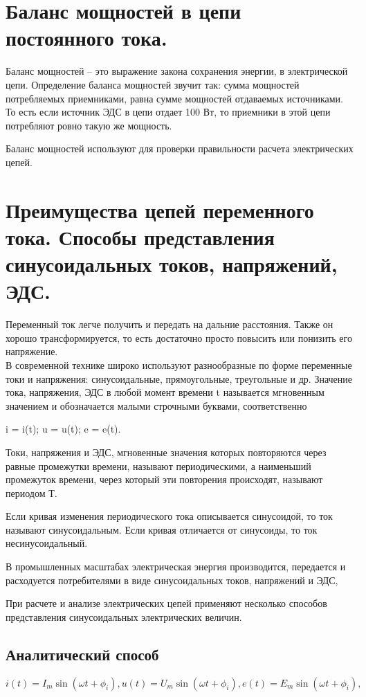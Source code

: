 \documentclass[a4paper, 12pt]{article}
\begin{document}
\section{Баланс мощностей в цепи постоянного тока.}
Баланс мощностей – это выражение закона сохранения энергии, в электрической цепи. Определение баланса мощностей звучит так: сумма мощностей потребляемых приемниками, равна сумме мощностей отдаваемых источниками. То есть если источник ЭДС в цепи отдает 100 Вт, то приемники в этой цепи потребляют ровно такую же мощность. 

Баланс мощностей используют для проверки правильности расчета электрических цепей. 
\section{Преимущества цепей переменного тока. Способы представления синусоидальных токов, напряжений, ЭДС.}
Переменный ток легче получить и передать на дальние расстояния. Также он хорошо трансформируется, то есть достаточно просто повысить или понизить его напряжение. \\

В современной технике широко используют разнообразные по форме переменные токи и напряжения: синусоидальные, прямоугольные, треугольные и др. Значение тока, напряжения, ЭДС в любой момент времени t называется мгновенным значением и обозначается малыми строчными буквами, соответственно

i = i(t); u = u(t); e = e(t).

Токи, напряжения и ЭДС, мгновенные значения которых повторяются через равные промежутки времени, называют периодическими, а наименьший промежуток времени, через который эти повторения происходят, называют периодом Т.

Если кривая изменения периодического тока описывается синусоидой, то ток называют синусоидальным. Если кривая отличается от синусоиды, то ток несинусоидальный.


В промышленных масштабах электрическая энергия производится, передается и расходуется потребителями в виде синусоидальных токов, напряжений и ЭДС,

При расчете и анализе электрических цепей применяют несколько способов представления синусоидальных электрических величин.

\subsection{ Аналитический способ}
\begin{equation*}
    i(t) = I_m \sin(\omega t + \phi_i),
    u(t) = U_m \sin(\omega t + \phi_i),
    e(t) = E_m \sin(\omega t + \phi_i),
\end{equation*}
\end{document}
